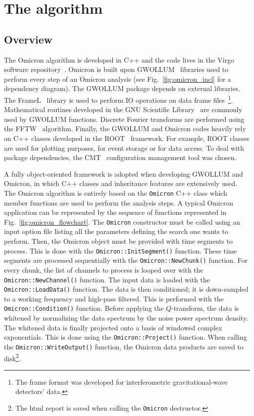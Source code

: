 \section{The algorithm} \label{sec:algorithm}

\subsection{Overview} \label{sec:algorithm:overview}
The Omicron algorithm is developed in C++ and the code lives in the Virgo software repository~\cite{VirgoSVN}. Omicron is built upon GWOLLUM~\cite{GWOLLUM} libraries used to perform every step of an Omicron analysis (see Fig.~\ref{fig:omicron_incl} for a dependency diagram). The GWOLLUM package depends on external libraries. The FrameL~\cite{FrameL} library is used to perform IO operations on data frame files~\footnote{The frame format was developed for interferometric gravitational-wave detectors' data.}. Mathematical routines developed in the GNU Scientific Library~\cite{GSL} are commonly used by GWOLLUM functions. Discrete Fourier transforms are performed using the FFTW~\cite{FFTW} algorithm. Finally, the GWOLLUM and Omicron codes heavily rely on C++ classes developed in the ROOT~\cite{Brun:1997pa} framework. For example, ROOT classes are used for plotting purposes, for event storage or for data access. To deal with package dependencies, the CMT~\cite{CMT} configuration management tool was chosen.

A fully object-oriented framework is adopted when developing GWOLLUM and Omicron, in which C++ classes and inheritance features are extensively used. The Omicron algorithm is entirely based on the \texttt{Omicron} C++ class which member functions are used to perform the analysis steps. A typical Omicron application can be represented by the sequence of functions represented in Fig.~\ref{fig:omicron_flowchart}. The \texttt{Omicron} constructor must be called using an input option file listing all the parameters defining the search one wants to perform. Then, the Omicron object must be provided with time segments to process. This is done with the \texttt{Omicron::InitSegment()} function. These time segments are processed sequentially with the \texttt{Omicron::NewChunk()} function. For every chunk, the list of channels to process is looped over with the \texttt{Omicron::NewChannel()} function. The input data is loaded with the \texttt{Omicron::LoadData()} function. The data is then conditioned; it is down-sampled to a working frequency and high-pass filtered. This is performed with the  \texttt{Omicron::Condition()} function. Before applying the $Q$-transform, the data is whitened by normalizing the data spectrum by the noise power spectrum density. The whitened data is finally projected onto a basis of windowed complex exponentials. This is done using the \texttt{Omicron::Project()} function. When calling the \texttt{Omicron::WriteOutput()} function, the Omicron data products are saved to disk\footnote{The html report is saved when calling the \texttt{Omicron} destructor.}.

